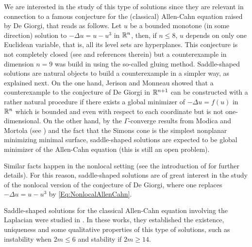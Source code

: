 We are interested in the study of this type of solutions since they are relevant in connection to a famous conjecture for the (classical) Allen-Cahn equation raised by De Giorgi, that reads as follows. Let $u$ be a bounded monotone (in some direction) solution to $-\Delta u = u - u^3$ in $\mathbb{R}^n$, then, if $n \leq 8$, $u$ depends on only one Euclidean variable, that is, all its level sets are hyperplanes. This conjecture is not completely closed (see \cite{FarinaValdinoci-DeGiorgi} and references therein) but a counterexample in dimension $n=9$ was build in \cite{delPinoKowalczykWei} using the so-called gluing method. Saddle-shaped solutions are natural objects to build a counterexample in a simpler way, as explained next. On the one hand, Jerison and Monneau \cite{JerisonMonneau} showed that a counterexample to the conjecture of De Giorgi in $\mathbb{R}^{n+1}$ can be constructed with a rather natural procedure if there exists a global minimizer of $-\Delta u = f(u)$ in $\mathbb{R}^n$ which is bounded and even with respect to each coordinate but is not one-dimensional. On the other hand, by the $\Gamma$-converge results from Modica and Mortola (see \cite{Modica,ModicaMortola}) and the fact that the Simons cone is the simplest nonplanar minimizing minimal surface, saddle-shaped solutions are expected to be global minimizer of the Allen-Cahn equation (this is still an open problem).

Similar facts happen in the nonlocal setting (see the introduction of \cite{Felipe-Sanz-Perela:SaddleFractional} for further details). For this reason, saddle-shaped solutions are of great interest in the study of the nonlocal version of the conjecture of De Giorgi, where one replaces $-\Delta u = u - u^3$ by \eqref{Eq:NonlocalAllenCahn}.

Saddle-shaped solutions for the classical Allen-Cahn equation involving the Laplacian were studied in \cite{DangFifePeletier, Schatzman, CabreTerraI,CabreTerraII, Cabre-Saddle}. In these works, they established the existence, uniqueness and some qualitative properties of this type of solutions, such as instability when $2m\leq 6$ and stability if $2m\geq 14$.

